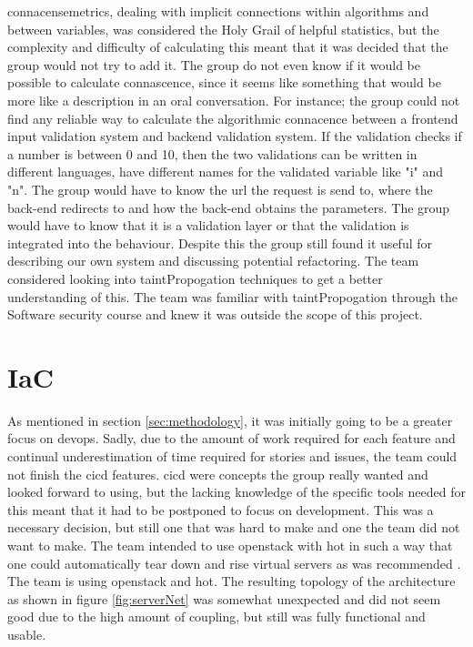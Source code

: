 \Gls{connacensemetrics}, dealing with implicit connections within algorithms and between variables, was considered the Holy Grail of helpful statistics, but the complexity and difficulty of calculating this meant that it was decided that the group would not try to add it. The group do not even know if it would be possible to calculate connascence, since it seems like something that would be more like a description in an oral conversation. For instance; the group could not find any reliable way to calculate the algorithmic connacence between a \gls{frontend} input validation system and \gls{backend} validation system. If the validation checks if a number is between 0 and 10, then the two validations can be written in different languages, have different names for the validated variable like "i" and "n". The group would have to know the \gls{url} the request is send to, where the back-end redirects to and how the back-end obtains the parameters. The group would have to know that it is a validation layer or that the validation is integrated into the behaviour. Despite this the group still found it useful for describing our own system and discussing potential refactoring. The team considered looking into \gls{taintPropogation} techniques to get a better understanding of this. The team was familiar with \Gls{taintPropogation} through the Software security course \cite{course:softSec} and knew it was outside the scope of this project.

\section{IaC}


As mentioned in section \ref{sec:methodology}, it was initially going to be a greater focus on \gls{devops}. Sadly, due to the amount of work required for each feature and continual underestimation of time required for stories and issues, the team could not finish the \gls{cicd} features. \gls{cicd} were concepts the group really wanted and looked forward to using, but the lacking knowledge of the specific tools needed for this meant that it had to be postponed to focus on development. This was a necessary decision, but still one that was hard to make and one the team did not want to make. The team intended to use \gls{openstack} with \gls{hot} in such a way that one could automatically tear down and rise virtual servers as was recommended \cite{morris2016infrastructure}. The team is using \gls{openstack} and \gls{hot}. The resulting topology of the architecture as shown in figure \ref{fig:serverNet} was somewhat unexpected and did not seem good due to the high amount of coupling, but still was fully functional and usable. 

